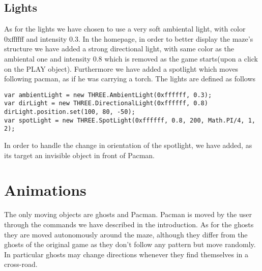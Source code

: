\documentclass[a4paper,oneside]{report}
\begin{document}
\section{Lights}
As for the lights we have chosen to use a very soft ambiental light, with color 0xffffff and intensity 0.3.
In the homepage, in order to better display the maze's structure we have added a strong directional light, with same color as the ambiental one and intensity 0.8 which is removed as the game starts(upon a click on the PLAY object). Furthermore we have added a spotlight which moves following pacman, as if he was carrying a torch.
The lights are defined as follows
\begin{lstlisting}
var ambientLight = new THREE.AmbientLight(0xffffff, 0.3);
var dirLight = new THREE.DirectionalLight(0xffffff, 0.8)
dirLight.position.set(100, 80, -50);
var spotLight = new THREE.SpotLight(0xffffff, 0.8, 200, Math.PI/4, 1, 2);
\end{lstlisting}
In order to handle the change in orientation of the spotlight, we have added, as its target an invisible object in front of Pacman.

\chapter{Animations}
The only moving objects are ghosts and Pacman. Pacman is moved by the user through the commands we have described in the introduction. As for the ghosts they are moved autonomously around the maze, although they differ from the ghosts of the original game as they don't follow any pattern but move randomly. In particular ghosts may change directions whenever they find themselves in a cross-road.
\end{document}
